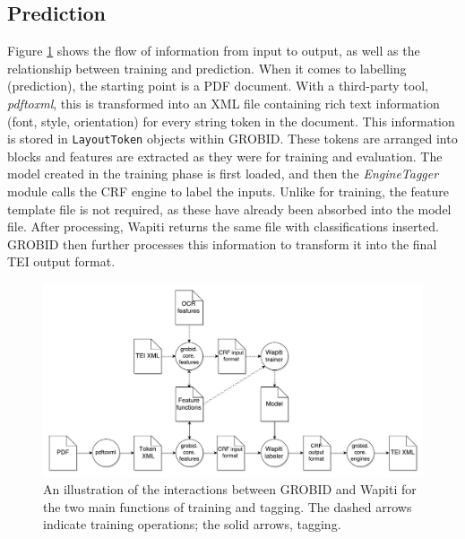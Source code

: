 \subsection{Prediction}

Figure \ref{fig:flow} shows the flow of information from input to output, as well as the relationship between training and prediction. When it comes to labelling (prediction), the starting point is a PDF document. With a third-party tool, \emph{pdftoxml}, this is transformed into an XML file containing rich text information (font, style, orientation) for every string token in the document. This information is stored in \texttt{LayoutToken} objects within GROBID. These tokens are arranged into blocks and features are extracted as they were for training and evaluation. The model created in the training phase is first loaded, and then the \emph{EngineTagger} module calls the CRF engine to label the inputs. Unlike for training, the feature template file is not required, as these have already been absorbed into the model file. After processing, Wapiti returns the same file with classifications inserted. GROBID then further processes this information to transform it into the final TEI output format.



\begin{figure}[!ht]
\center
\includegraphics[width=\textwidth]{Figures/grobid.pdf}
\caption{An illustration of the interactions between GROBID and Wapiti for the two main functions of training and tagging. The dashed arrows indicate training operations; the solid arrows, tagging.}
\label{fig:flow}
\end{figure}

